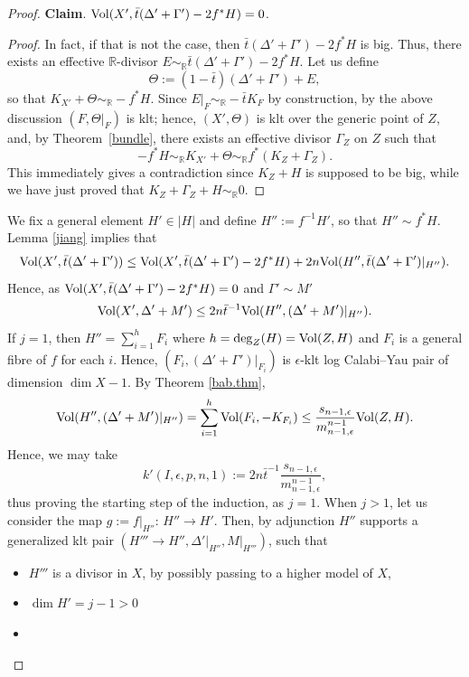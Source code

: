 \documentclass{amsart}[12pt,a4paper]
\theoremstyle{definition}
\begin{document}
\begin{proof}
{\bf Claim}. ${\rm Vol}(X',\bar{t}(\Delta'+\Gamma')-2f^*H)=0$. 
\begin{proof}
In fact, if that is not the case, then $\bar{t}(\Delta'+\Gamma')-2f^*H$ is big.
Thus, there exists an effective $\mathbb{R}$-divisor $E\sim_{\mathbb{R}} \bar{t}(\Delta'+\Gamma')-2f^*H$. 
Let us define 
\[
\Theta:=(1-\bar{t})(\Delta'+\Gamma')+E,
\]
\noindent
so that $K_{X'}+\Theta\sim_{\mathbb{R}} -f^*H$.
Since $E\vert_F \sim_{\mathbb{R}} -\bar{t}K_F$ by construction, by the above discussion $(F, \Theta\vert_F)$ is klt; 
hence, $(X',\Theta)$ is klt over the generic point of $Z$, and, by Theorem~\ref{bundle}, there exists an effective divisor $\Gamma_Z$ on $Z$ such that 
\[
- f^*H \sim_{\mathbb{R}} K_{X'}+\Theta \sim_{\mathbb{R}} f^*(K_Z+\Gamma_Z).
\]
\noindent 
This immediately gives a contradiction since $K_Z+H$ is supposed to be big, while we have just proved that $K_Z+\Gamma_Z+H \sim_{\mathbb{R}} 0$.
\end{proof}
\noindent
We fix a general element $H' \in |H|$ and define $H'':=f^{-1}H'$, so that $H'' \sim f^\ast H$.
\\
Lemma \ref{jiang} implies that 
\[
{\rm Vol}(X',\bar{t}(\Delta'+\Gamma')) \leq 
{\rm Vol}(X',\bar{t}(\Delta'+\Gamma')-2f^\ast H)+2n{\rm Vol}(H'',\bar{t}(\Delta'+\Gamma')|_{H''}).
\]
Hence, as ${\rm Vol}(X',\bar{t}(\Delta'+\Gamma')-2f^\ast H)=0$ and $\Gamma' \sim M'$
\[
{\rm Vol}(X',\Delta'+M')\leq 2n \bar{t}^{-1} {\rm Vol}(H'',(\Delta'+M')|_{H''}).
\]
\noindent
If $j=1$, then $H''=\sum_{i=1}^hF_i$ where $h=\deg_Z(H)={\rm Vol}(Z, H)$ and $F_i$ is a general fibre of $f$ for each $i$.
Hence, $(F_i, (\Delta'+\Gamma')|_{F_i})$ is $\epsilon$-klt log Calabi--Yau pair of dimension $\dim X-1$. 
By Theorem \ref{bab.thm},
\[
{\rm Vol}(H'',(\Delta'+M')|_{H''})=\sum_{i=1}^h{\rm Vol}(F_i, -K_{F_i})\leq \frac{s_{n-1, \epsilon}}{m_{n-1, \epsilon}^{n-1}} {\rm Vol}(Z, H).
\]
Hence, we may take 
\[
k'(I,\epsilon, p, n, 1):=2n \bar{t}^{-1} \frac{s_{n-1, \epsilon}}{m_{n-1, \epsilon}^{n-1}},
\]
thus proving the starting step of the induction, as $j=1$.
\newline
When $j >1$, let us consider the map $g:=f|_{H''}$: $H''\rightarrow H'$. 
Then, by adjunction $H''$ supports a generalized klt pair $(H''' \to H'', \Delta'\vert_{H''}, M\vert_{H'''})$, such that 
\begin{itemize}
\item 
$H'''$ is a divisor in $X$, by possibly passing to a higher model of $X$,
\item 
$\dim H'=j-1 >0$
\item 

\end{itemize}
\end{proof}
\end{document}
